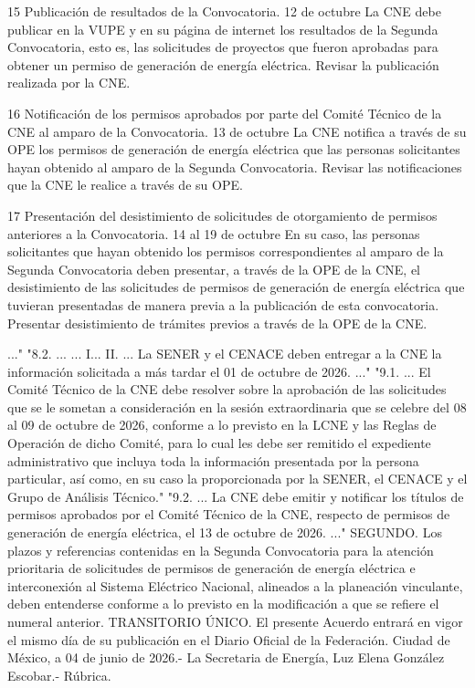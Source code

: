  15
 Publicación de resultados de la Convocatoria.
 12 de octubre
 La CNE debe publicar en la VUPE y en su página de internet los resultados de la Segunda Convocatoria, esto es, las solicitudes de proyectos que fueron aprobadas para obtener un permiso de generación de energía eléctrica.
 Revisar la publicación realizada por la CNE.
 
 16
 Notificación de los permisos aprobados por parte del Comité Técnico de la CNE al amparo de la Convocatoria.
 13 de octubre
 La CNE notifica a través de su OPE los permisos de generación de energía eléctrica que las personas solicitantes hayan obtenido al amparo de la Segunda Convocatoria.
 Revisar las notificaciones que la CNE le realice a través de su OPE.
 
 17
 Presentación del desistimiento de solicitudes de otorgamiento de permisos anteriores a la Convocatoria.
 14 al 19 de octubre
 En su caso, las personas solicitantes que hayan obtenido los permisos correspondientes al amparo de la Segunda Convocatoria deben presentar, a través de la OPE de la CNE, el desistimiento de las solicitudes de permisos de generación de energía eléctrica que tuvieran presentadas de manera previa a la publicación de esta convocatoria.
 Presentar desistimiento de trámites previos a través de la OPE de la CNE.
 
 \par
..."
"8.2. ...
...
I...
II. ...
La SENER y el CENACE deben entregar a la CNE la información solicitada a más tardar el 01 de octubre de 2026.
..."
"9.1. ...
El Comité Técnico de la CNE debe resolver sobre la aprobación de las solicitudes que se le sometan a consideración en la sesión extraordinaria que se celebre del 08 al 09 de octubre de 2026, conforme a lo previsto en la LCNE y las Reglas de Operación de dicho Comité, para lo cual les debe ser remitido el expediente administrativo que incluya toda la información presentada por la persona particular, así como, en su caso la proporcionada por la SENER, el CENACE y el Grupo de Análisis Técnico."
"9.2. ...
La CNE debe emitir y notificar los títulos de permisos aprobados por el Comité Técnico de la CNE, respecto de permisos de generación de energía eléctrica, el 13 de octubre de 2026.
..."
SEGUNDO. Los plazos y referencias contenidas en la Segunda Convocatoria para la atención prioritaria de solicitudes de permisos de generación de energía eléctrica e interconexión al Sistema Eléctrico Nacional, alineados a la planeación vinculante, deben entenderse conforme a lo previsto en la modificación a que se refiere el numeral anterior.
TRANSITORIO
ÚNICO. El presente Acuerdo entrará en vigor el mismo día de su publicación en el Diario Oficial  de la Federación.
Ciudad de México, a 04 de junio de 2026.- La Secretaria de Energía, Luz Elena González Escobar.- Rúbrica.\par
\endgroup
